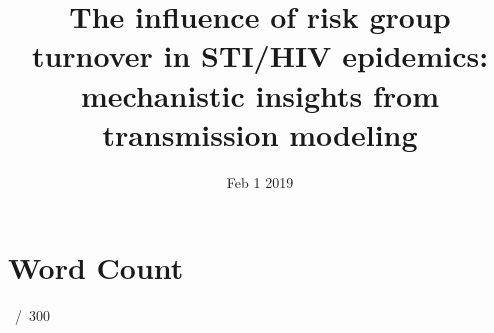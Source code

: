 \documentclass{article}
\title{The influence of risk group turnover in STI/HIV epidemics: mechanistic insights from transmission modeling}
\date{Feb 1 2019}
\begin{document}
\maketitle
\vspace{-2em}

\section{Word Count}
~/~300
\end{document}
